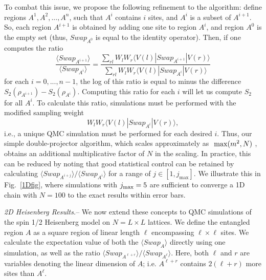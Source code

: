 \documentclass[prl,aps,twocolumn,floatfix,amsmath,amssymb,superscriptaddress,tightenlines]{revtex4}
\begin{document}
To combat this issue, we propose the following refinement to the algorithm: define regions $A^1,A^2,...,A^n$, such
that $A^i$ contains $i$ sites, and $A^i$ is a subset of $A^{i+1}$.  So, each region $A^{i+1}$ is obtained by adding one site to region
$A^{i}$, and region $A^0$ is the empty set (thus, $Swap_{A^0}$ is equal to the identity operator).
Then, if one computes the ratio
\begin{equation}
\frac{\langle Swap_{A^{i+1}}\rangle}{\langle Swap_{A^{i}}\rangle}
= \frac{\sum_{rl} W_l W_r \langle V(l) | Swap_{A^{i+1}} | V(r) \rangle} {\sum_{rl} W_l W_r \langle V(l) | Swap_{A^i} | V(r) \rangle}
\label{Ratio}
\end{equation}
for each $i=0,...,n-1$, the log of this ratio is equal to minus the
difference $S_2(\rho_{A^{i+1}})-S_2(\rho_{A^{i}})$.
Computing this ratio for each $i$ will let us compute $S_2$ for all $A^i$.  To calculate this ratio, simulations must be performed 
with the modified sampling weight
\begin{equation}
W_l W_r \langle V(l) | Swap_{A^i} | V(r) \rangle,
\end{equation}
i.e., a unique QMC simulation must be performed for each desired $i$.  Thus, our simple double-projector algorithm, which scales 
approximately as $~{\rm max}(m^2, N)$ \cite{AWSloop}, obtains an additional multiplicative factor of $N$ in the scaling.  In practice, 
this can be reduced by noting that good statistical control can be retained by calculating 
${\langle Swap_{A^{i+j}}\rangle}/{\langle Swap_{A^{i}}\rangle}$ for a range of $j \in [1,j_{\max}]$.  We illustrate this in Fig.~\ref{1Dfig},
where simulations with $j_{\rm max}=5$ are sufficient to converge a 1D chain with $N=100$ to the exact results within error bars.

{\it 2D Heisenberg Results.}-- We now extend these concepts to QMC simulations of the spin 1/2 Heisenberg model on $N=L \times L$ lattices.  We define the entangled region $A$ as a square region of linear length $\ell$ encompassing $\ell \times \ell$ sites.  We calculate the expectation value of both the $\langle Swap_A \rangle$ directly using one simulation, as well as the ratio ${\langle Swap_{A^{\ell+r}}\rangle}/{\langle Swap_{A^{\ell}}\rangle}$.  Here, both $\ell$ and $r$ are variables denoting the linear dimension of $A$; i.e. $A^{\ell+r}$ contains $2(\ell+r)$ more sites than $A^{\ell}$.
\end{document}
